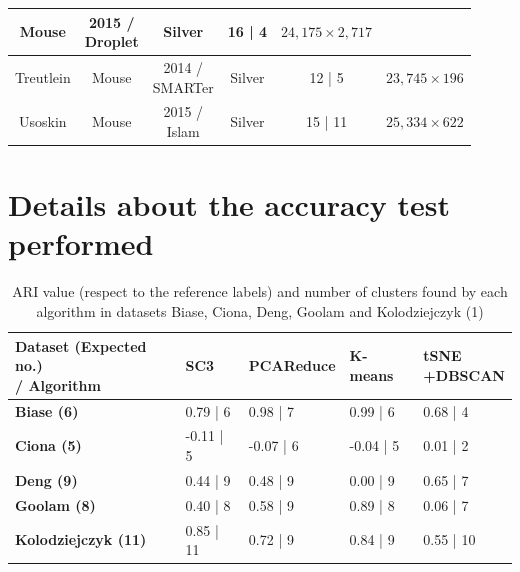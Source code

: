 \documentclass{report}
\begin{document}
{\begin{table}[H]
\begin{tabular}{| c | c | c | c | c | c |}
\parbox[c]{2cm}{Mouse} & 
\parbox[c]{3cm}{2015 /\\Droplet} & 
\parbox[c]{2cm}{Silver}&
\parbox[c]{2cm}{16 | 4}&
\parbox[c]{2cm}{$24,175 \times 2,717$}\\
\hline
\parbox[c]{3cm}{Treutlein\cite{treutlein2014reconstructing}} & 
\parbox[c]{2cm}{Mouse} & 
\parbox[c]{3cm}{2014 /\\SMARTer} & 
\parbox[c]{2cm}{Silver} &
\parbox[c]{2cm}{12 | 5}&
\parbox[c]{2cm}{$23,745 \times 196$}\\
\hline
\parbox[c]{3cm}{Usoskin\cite{usoskin2015unbiased}} & 
\parbox[c]{2cm}{Mouse} & 
\parbox[c]{3cm}{2015 /\\Islam} & 
\parbox[c]{2cm}{Silver} &
\parbox[c]{2cm}{15 | 11}&
\parbox[c]{2cm}{$25,334 \times 622$}\\
\hline
\end{tabular}
\label{datasets}
\end{table}

\section*{Details about the accuracy test performed}

\begin{table}[H]
\centering
\caption{ARI value (respect to the reference labels) and number of clusters found by each algorithm in datasets Biase, Ciona, Deng, Goolam and Kolodziejczyk (1)}
\begin{tabular}{| l | l | l | l | l |}
\hline
\parbox[c]{5cm}{\textbf{Dataset (Expected no.)\\ / Algorithm}} & 
\parbox[c]{2cm}{\textbf{SC3}} & 
\parbox[c]{2cm}{\textbf{PCAReduce}} &
\parbox[c]{2cm}{\textbf{K-means}}&
\parbox[c]{2cm}{\textbf{tSNE\\+DBSCAN}}\\
\hline
\parbox[c]{5cm}{\textbf{Biase (6)}} & 
\parbox[c]{2cm}{0.79 | 6} & 
\parbox[c]{2cm}{0.98 | 7} &
\parbox[c]{2cm}{0.99 | 6}&
\parbox[c]{2cm}{0.68 | 4}\\
\hline
\parbox[c]{5cm}{\textbf{Ciona (5)}} & 
\parbox[c]{2cm}{-0.11 | 5} & 
\parbox[c]{2cm}{-0.07 | 6} &
\parbox[c]{2cm}{-0.04 | 5}&
\parbox[c]{2cm}{0.01 | 2}\\
\hline
\parbox[c]{5cm}{\textbf{Deng (9)}} & 
\parbox[c]{2cm}{0.44 | 9} & 
\parbox[c]{2cm}{0.48 | 9} &
\parbox[c]{2cm}{0.00 | 9}&
\parbox[c]{2cm}{0.65 | 7}\\
\hline
\parbox[c]{5cm}{\textbf{Goolam (8)}} & 
\parbox[c]{2cm}{0.40 | 8} & 
\parbox[c]{2cm}{0.58 | 9} &
\parbox[c]{2cm}{0.89 | 8}&
\parbox[c]{2cm}{0.06 | 7}\\
\hline
\parbox[c]{5cm}{\textbf{Kolodziejczyk (11)}} & 
\parbox[c]{2cm}{0.85 | 11} & 
\parbox[c]{2cm}{0.72 | 9} &
\parbox[c]{2cm}{0.84 | 9}&
\parbox[c]{2cm}{0.55 | 10}\\
\hline
\end{tabular}
\label{numberclusters11}
\end{table}

}
\end{document}
